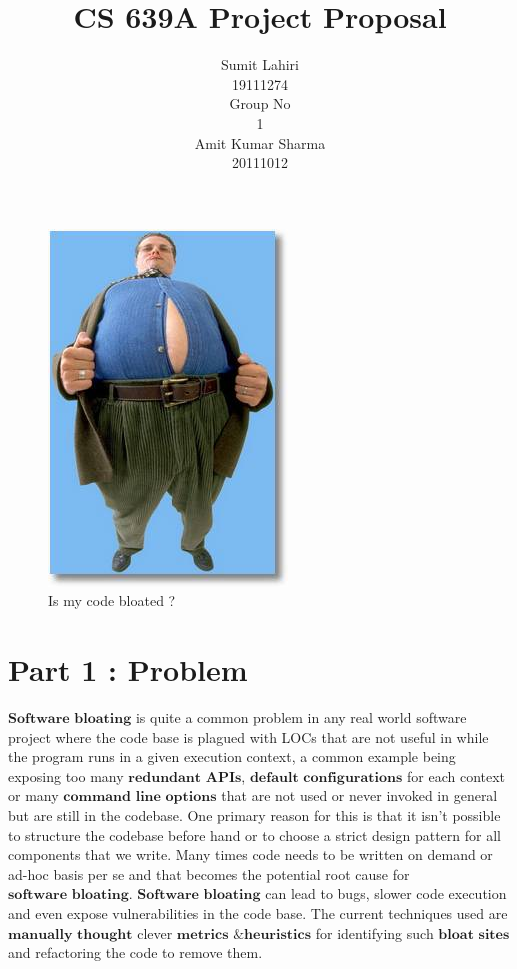 \documentclass{article} %
\title{CS 639A Project Proposal}
\author{
Sumit Lahiri \\
19111274 \\
\And
Group No\\
1\\
\And
Amit Kumar Sharma \\
20111012\\
}
\begin{document}
\maketitle

\begin{figure}[htbp]
\centerline{\includegraphics[scale=0.3]{bloat.jpg}}
\caption{Is my code bloated ?}
\label{fig}
\end{figure}

\section*{Part 1 : Problem}
$\textbf{Software bloating}$ is quite a common problem in any real world software project where the code base is plagued with LOCs that are not useful in while the program runs in a given execution context, a common example being exposing too many $\textbf{redundant APIs}$, $\textbf{default configurations}$ for each context or many $\textbf{command line options}$ that are not used or never invoked in general but are still in the codebase. One primary reason for this is that it isn't possible to structure the codebase before hand or to choose a strict design pattern for all components that we write. Many times code needs to be written on demand or ad-hoc basis per se and that becomes the potential root cause for $\textbf{software bloating}$. $\textbf{Software bloating}$ can lead to bugs, slower code execution and even expose vulnerabilities in the code base. The current techniques used are $\textbf{manually thought}$ clever $\textbf{metrics \& heuristics}$ for identifying such $\textbf{bloat sites}$ and refactoring the code to remove them. 
\end{document}
